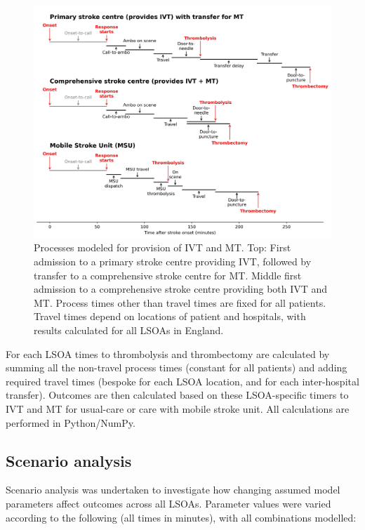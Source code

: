 \begin{figure}[h]
    \centering
    \includegraphics[width=0.85\linewidth]{images/stroke_treatment.jpg}
    \caption{Processes modeled for provision of IVT and MT. Top: First admission to a primary stroke centre providing IVT, followed by transfer to a comprehensive stroke centre for MT. Middle first admission to a comprehensive stroke centre providing both IVT and MT. Process times other than travel times are fixed for all patients. Travel times depend on locations of patient and hospitals, with results calculated for all LSOAs in England.}
    \label{fig:process}
\end{figure}

For each LSOA times to thrombolysis and thrombectomy are calculated by summing all the non-travel process times (constant for all patients) and adding required travel times (bespoke for each LSOA location, and for each inter-hospital transfer). Outcomes are then calculated based on these LSOA-specific timers to IVT and MT for usual-care or care with mobile stroke unit. All calculations are performed in Python/NumPy.


\subsection{Scenario analysis}

Scenario analysis was undertaken to investigate how changing assumed model parameters affect outcomes across all LSOAs. Parameter values were varied according to the following (all times in minutes), with all combinations modelled:

